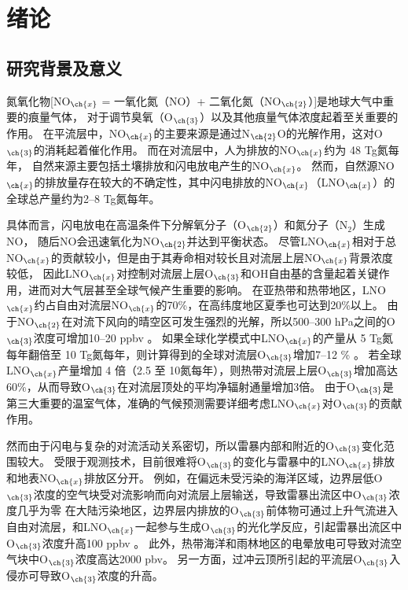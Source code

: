 
\chapter{绪论}

\section{研究背景及意义}

氮氧化物[NO$_{\ch{x}}$ = 一氧化氮（NO）+ 二氧化氮（NO$_{\ch{2}}$）]是地球大气中重要的痕量气体，
对于调节臭氧（O$_{\ch{3}}$）以及其他痕量气体浓度起着至关重要的作用。
在平流层中，NO$_{\ch{x}}$的主要来源是通过N$_{\ch{2}}$O的光解作用，这对O$_{\ch{3}}$的消耗起着催化作用。
而在对流层中，人为排放的NO$_{\ch{x}}$约为 48 Tg氮每年\citep{Miyazaki.2017}，
自然来源主要包括土壤排放和闪电放电产生的NO$_{\ch{x}}$\citep{Finlayson-PittsBarbaraJ..2000,Vinken.2014}。
然而，自然源NO$_{\ch{x}}$的排放量存在较大的不确定性，其中闪电排放的NO$_{\ch{x}}$（LNO$_{\ch{x}}$）的全球总产量约为2--8 Tg氮每年\citep{Schumann.2007}。

具体而言，闪电放电在高温条件下分解氧分子（O$_{\ch{2}}$）和氮分子（N$_2$）生成NO，
随后NO会迅速氧化为NO$_{\ch{2}}$并达到平衡状态\citep{Zeldovich.1967}。
尽管LNO$_{\ch{x}}$相对于总NO$_{\ch{x}}$的贡献较小，但是由于其寿命相对较长且对流层上层NO$_{\ch{x}}$背景浓度较低，
因此LNO$_{\ch{x}}$对控制对流层上层O$_{\ch{3}}$和OH自由基的含量起着关键作用，进而对大气层甚至全球气候产生重要的影响\citep{Levy.1996}。
在亚热带和热带地区，LNO$_{\ch{x}}$约占自由对流层NO$_{\ch{x}}$的70\%，在高纬度地区夏季也可达到20\%以上\citep{Jourdain.2001,Martin.2002,Galloway.2004,Allen.2010}。
由于NO$_{\ch{2}}$在对流下风向的晴空区可发生强烈的光解，所以500--300 hPa之间的O$_{\ch{3}}$浓度可增加10--20 ppbv \citep{DeCaria.2005,Hauglustaine.2001}。
如果全球化学模式中LNO$_{\ch{x}}$的产量从 5 Tg氮每年翻倍至 10 Tg氮每年，则计算得到的全球对流层O$_{\ch{3}}$增加7--12 \% \citep{Brasseur.1996,Labrador.2005}。
若全球LNO$_{\ch{x}}$产量增加 4 倍（2.5 至 10氮每年），则热带对流层上层O$_{\ch{3}}$增加高达60\%，从而导致O$_{\ch{3}}$在对流层顶处的平均净辐射通量增加3倍。
由于O$_{\ch{3}}$是第三大重要的温室气体，准确的气候预测需要详细考虑LNO$_{\ch{x}}$对O$_{\ch{3}}$的贡献作用。

然而由于闪电与复杂的对流活动关系密切，所以雷暴内部和附近的O$_{\ch{3}}$变化范围较大。
受限于观测技术，目前很难将O$_{\ch{3}}$的变化与雷暴中的LNO$_{\ch{x}}$排放和地表NO$_{\ch{x}}$排放区分开\citep{Schultz.2004}。
例如，在偏远未受污染的海洋区域，边界层低O$_{\ch{3}}$浓度的空气块受对流影响而向对流层上层输送，导致雷暴出流区中O$_{\ch{3}}$浓度几乎为零\citep{Kley.1996a,Folkins.2002}
在大陆污染地区，边界层内排放的O$_{\ch{3}}$前体物可通过上升气流进入自由对流层，和LNO$_{\ch{x}}$一起参与生成O$_{\ch{3}}$的光化学反应，引起雷暴出流区中O$_{\ch{3}}$浓度升高100 ppbv \citep{Pickering.1990,Pickering.1996,Bond.2002,Huntrieser.2016a}。
此外，热带海洋和雨林地区的电晕放电可导致对流空气块中O$_{\ch{3}}$浓度高达2000 pbv\citep{Zahn.2002,Minschwaner.2008,Bozem.2014,Kotsakis.2017}。
另一方面，过冲云顶所引起的平流层O$_{\ch{3}}$入侵亦可导致O$_{\ch{3}}$浓度的升高\citep{Homeyer.2014}。

